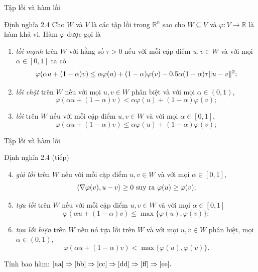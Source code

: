 \documentclass[aspectratio=169]{beamer}
\DeclarePairedDelimiter{\pro}{\langle}{\rangle}
\DeclarePairedDelimiter{\norm}{\lVert}{\rVert}
\theoremstyle{plain}
\theoremstyle{definition}
\theoremstyle{remark}
\begin{document}
\begin{frame}{Tập lồi và hàm lồi}
\begin{block}{Định nghĩa 2.4}
     Cho $W$ và $V$ là các tập lồi trong $\mathbb{R}^n$ sao cho $W\subseteq V$ và $\varphi: V\to\mathbb{R}$ là hàm khả vi. Hàm $\varphi$ được gọi là
	\begin{enumerate}
		\item \textit{lồi mạnh} trên $W$ với hằng số $\tau>0$ nếu với mỗi cặp điểm $u,v\in W$ và với mọi $\alpha\in[0,1]$ ta có 
		$$
		\varphi(\alpha u+(1-\alpha)v)\leq\alpha\varphi(u)+(1-\alpha)\varphi(v) - 0.5\alpha(1-\alpha)\tau\norm{u-v}^2;\label{aa}
		$$
		\item \textit{lồi chặt} trên $W$ nếu với mọi $u,v\in W$ phân biệt và với mọi $\alpha\in(0,1)$, 
		$$
		\varphi(\alpha u+(1-\alpha)v)<\alpha\varphi(u)+(1-\alpha)\varphi(v);\label{bb}
		$$
		\item \textit{lồi} trên $W$ nếu với mỗi cặp điểm $u,v\in W$ và với mọi $\alpha\in[0,1]$,
		$$
		\varphi(\alpha u+(1-\alpha)v)\leq\alpha\varphi(u)+(1-\alpha)\varphi(v);\label{cc}
		$$
    \end{enumerate}
\end{block}

\end{frame}

\begin{frame}{Tập lồi và hàm lồi}
\begin{block}{Định nghĩa 2.4 (tiếp)}
    \begin{enumerate}
    \setcounter{enumi}{3}
		\item \textit{giả lồi} trên $W$ nếu với mỗi cặp điểm $u,v\in W$ và với mọi $\alpha\in[0,1]$,
		$$
		\pro{\nabla\varphi(v),u-v}\geq 0 \text{ suy ra } \varphi(u)\geq\varphi(v);\label{dd}
		$$
		\item \textit{tựa lồi} trên $W$ nếu với mỗi cặp điểm $u,v\in W$ và với mọi $\alpha\in[0,1]$
		$$
		\varphi(\alpha u+(1-\alpha)v)\leq\max\{\varphi(u),\varphi(v)\};\label{ee}
		$$
		\item \textit{tựa lồi hiện} trên $W$ nếu nó tựa lồi trên $W$ và với mọi $u,v\in W$ phân biệt, mọi $\alpha\in(0,1)$,
		$$
		\varphi(\alpha u+(1-\alpha)v)<\max\{\varphi(u),\varphi(v)\}.\label{ff}
		$$
	\end{enumerate}
\end{block}
Tính bao hàm:
$
\ref{aa}\Rightarrow\ref{bb}\Rightarrow\ref{cc}\Rightarrow\ref{dd}\Rightarrow\ref{ff}\Rightarrow\ref{ee}.
$
\end{frame}
\end{document}
